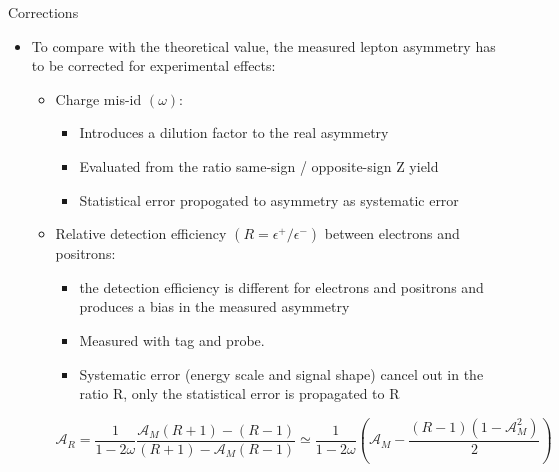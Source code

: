 \documentclass[t, 8pt]{beamer}
\begin{document}
\begin{frame}{Corrections}
  \begin{itemize}
    \item To compare with the theoretical value, the measured lepton asymmetry has to be corrected for experimental effects:
    \begin{itemize}
      \item Charge mis-id $(\omega)$: 
      \begin{itemize}
        \item Introduces a dilution factor to the real asymmetry
        \item Evaluated from the ratio same-sign / opposite-sign Z yield
        \item Statistical error propogated to asymmetry as systematic error
      \end{itemize}
      \item Relative detection efficiency $(R = \epsilon^+/\epsilon^-)$ between electrons and positrons: 
      \begin{itemize}
        \item the detection efficiency is different for electrons and positrons and produces a bias in the measured asymmetry
        \item Measured with tag and probe.
        \item Systematic error (energy scale and signal shape) cancel out in the ratio R, only the statistical error is propagated to R
      \end{itemize}
      \begin{center}
      \begin{equation}
        \mathcal{A}_R=
          \frac{1}{1-2\omega}\frac{ \mathcal{A}_M\left(R+1\right) - \left(R-1\right)}{\left(R+1\right)-\mathcal{A}_M \left(R-1\right)}
          \simeq 
          \frac{1}{1-2\omega}\left(\mathcal{A}_M -\frac{\left(R-1\right)\left(1-\mathcal{A}_M^2\right)}{2}\right)
      \end{equation}
      \end{center}
    \end{itemize}
  \end{itemize}
\end{frame}
\end{document}
